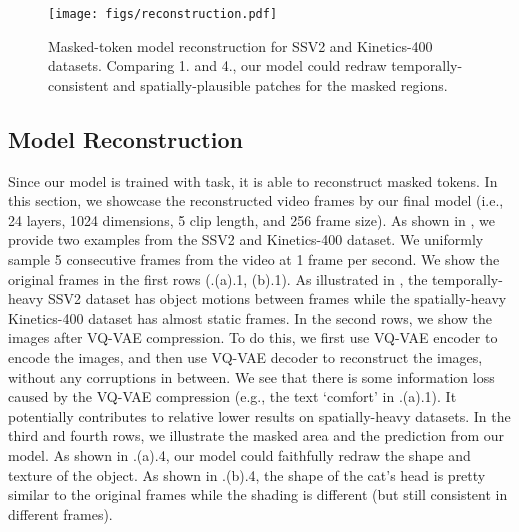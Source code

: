 \begin{figure}[t]
\vskip 0.1in
\begin{center}
\texttt{[image: figs/reconstruction.pdf]}
\caption{
Masked-token model reconstruction for SSV2 and Kinetics-400 datasets. Comparing 1. and 4., our model could redraw temporally-consistent and spatially-plausible patches for the masked regions.
}
\label{fig:reconstruction}
\end{center}
\end{figure}


\subsection{Model Reconstruction}
\label{sec:append_recon_visualization}
Since our model is trained with \ourmask task, it is able to reconstruct masked tokens.
In this section, we showcase the reconstructed video frames by our final model (i.e., 24 layers, 1024 dimensions, 5 clip length, and 256 frame size).
As shown in , we provide two examples from the SSV2 and Kinetics-400 dataset.
We uniformly sample 5 consecutive frames from the video at 1 frame per second.
We show the original frames in the first rows (.(a).1, (b).1).
As illustrated in , the temporally-heavy SSV2 dataset has object motions between frames while the spatially-heavy Kinetics-400 dataset has almost static frames.
In the second rows, we show the images after VQ-VAE compression.
To do this, we first use VQ-VAE encoder to encode the images, and then use VQ-VAE decoder to reconstruct the images, without any corruptions in between.
We see that there is some information loss caused by the VQ-VAE compression (e.g., the text `comfort' in .(a).1).  
It potentially contributes to relative lower results on spatially-heavy datasets.
In the third and fourth rows, we illustrate the masked area and the prediction from our model.
As shown in .(a).4, our model could faithfully redraw the shape and texture of the object.
As shown in .(b).4, the shape of the cat's head is pretty similar to the original frames while the shading is different (but still consistent in different frames).
